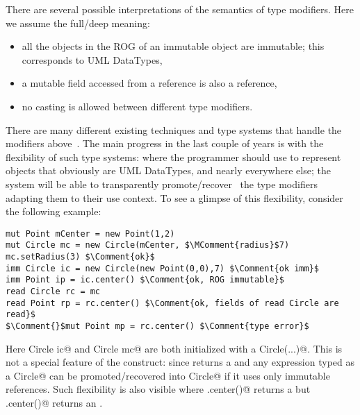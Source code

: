 There are several possible interpretations of the semantics of type modifiers.
Here we assume the full/deep meaning:
\begin{itemize}
\item all the objects in the ROG of an immutable object are immutable;
 this corresponds to UML DataTypes,
\item a mutable field accessed from a \Q@read@ reference is also a \Q@read@ reference,
\item no casting is allowed between different type modifiers.
\end{itemize}

\noindent There are many different existing techniques and type systems that handle the modifiers above~\cite{ZibinEtAl10,ClarkeWrigstad03,HallerOdersky10,GordonEtAl12,ServettoZucca15}.
The main progress in the last couple of years is with the flexibility of such type systems: where the programmer should use \Q@imm@ to represent objects that obviously are UML DataTypes, and \Q@mut@ nearly everywhere else; the system will be able to transparently promote/recover~\cite{GordonEtAl12,clebsch2015deny,ServettoZucca15} the type modifiers adapting them to their use context.
To see a glimpse of this flexibility, consider the following example:
\saveSpace

\begin{lstlisting}
mut Point mCenter = new Point(1,2)
mut Circle mc = new Circle(mCenter, $\MComment{radius}$7)
mc.setRadius(3) $\Comment{ok}$
imm Circle ic = new Circle(new Point(0,0),7) $\Comment{ok imm}$
imm Point ip = ic.center() $\Comment{ok, ROG immutable}$
read Circle rc = mc
read Point rp = rc.center() $\Comment{ok, fields of read Circle are read}$
$\Comment{}$mut Point mp = rc.center() $\Comment{type error}$ 
\end{lstlisting}
\saveSpace

Here \Q@imm Circle ic@ and
\Q@mut Circle mc@ are both initialized with a \Q@new Circle(...)@.
This is not a special feature of the \Q@new@ construct: since \Q@new@ returns a \Q@mut@ and any expression typed as a \Q@mut Circle@ can be promoted/recovered into \Q@imm Circle@ if it uses only immutable references.
Such flexibility is also visible where \Q@rc.center()@ returns a \Q@read@ but \Q@ic.center()@ returns an \Q@imm@.

